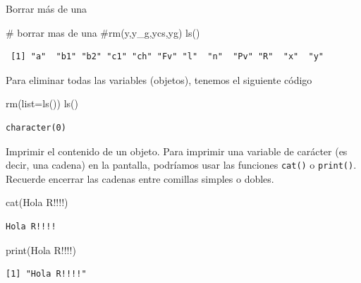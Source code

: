 \documentclass[
  ignorenonframetext,
  aspectratio=169,
  spanish,
]{beamer}
\newenvironment{Shaded}{\begin{snugshade}}{\end{snugshade}}
\newcommand{\AttributeTok}[1]{\textcolor[rgb]{0.40,0.45,0.13}{#1}}
\newcommand{\CommentTok}[1]{\textcolor[rgb]{0.37,0.37,0.37}{#1}}
\newcommand{\FunctionTok}[1]{\textcolor[rgb]{0.28,0.35,0.67}{#1}}
\newcommand{\NormalTok}[1]{\textcolor[rgb]{0.00,0.23,0.31}{#1}}
\newcommand{\StringTok}[1]{\textcolor[rgb]{0.13,0.47,0.30}{#1}}
\begin{document}
\begin{frame}[fragile]{Borrar más de una}
\label{borrar-muxe1s-de-una}
\begin{Shaded}
\begin{Highlighting}[]
\CommentTok{\# borrar mas de una }
\CommentTok{\#rm(y,y\_g,ycs,yg)}
\FunctionTok{ls}\NormalTok{()}
\end{Highlighting}
\end{Shaded}

\begin{verbatim}
 [1] "a"  "b1" "b2" "c1" "ch" "Fv" "l"  "n"  "Pv" "R"  "x"  "y" 
\end{verbatim}

Para eliminar todas las variables (objetos), tenemos el siguiente código

\begin{Shaded}
\begin{Highlighting}[]
\FunctionTok{rm}\NormalTok{(}\AttributeTok{list=}\FunctionTok{ls}\NormalTok{())}
\FunctionTok{ls}\NormalTok{()}
\end{Highlighting}
\end{Shaded}

\begin{verbatim}
character(0)
\end{verbatim}
\end{frame}

\begin{frame}[fragile]{Imprimir el contenido de un objeto.}
\label{imprimir-el-contenido-de-un-objeto.}
Para imprimir una variable de carácter (es decir, una cadena) en la
pantalla, podríamos usar las funciones \texttt{cat()} o
\texttt{print()}. Recuerde encerrar las cadenas entre comillas simples o
dobles.

\begin{Shaded}
\begin{Highlighting}[]
\FunctionTok{cat}\NormalTok{(}\StringTok{\textquotesingle{}Hola R!!!!\textquotesingle{}}\NormalTok{)}
\end{Highlighting}
\end{Shaded}

\begin{verbatim}
Hola R!!!!
\end{verbatim}

\begin{Shaded}
\begin{Highlighting}[]
\FunctionTok{print}\NormalTok{(}\StringTok{\textquotesingle{}Hola R!!!!\textquotesingle{}}\NormalTok{)}
\end{Highlighting}
\end{Shaded}

\begin{verbatim}
[1] "Hola R!!!!"
\end{verbatim}
\end{frame}
\end{document}
